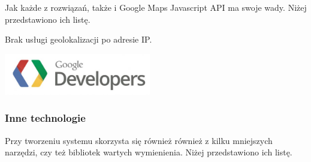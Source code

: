 Jak każde z rozwiązań, także i Google Maps Javascript API ma swoje wady. Niżej przedstawiono ich listę.
\begin{packed_item}
    \item{Brak usługi geolokalizacji po adresie IP.}
\end{packed_item}

\begin{center}
    \includegraphics[width=0.48\textwidth]{img/logos/google-maps-api.jpg}
\end{center}

\newpage
\subsubsection{Inne technologie}
Przy tworzeniu systemu skorzysta się również również z kilku mniejszych narzędzi, czy też bibliotek wartych wymienienia. Niżej przedstawiono ich listę.

